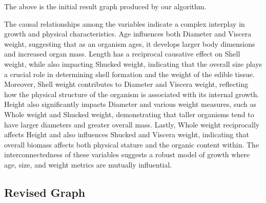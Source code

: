 \documentclass{article}
\begin{document}
The above is the initial result graph produced by our algorithm.

The causal relationships among the variables indicate a complex interplay in growth and physical characteristics. Age influences both Diameter and Viscera weight, suggesting that as an organism ages, it develops larger body dimensions and increased organ mass. Length has a reciprocal causative effect on Shell weight, while also impacting Shucked weight, indicating that the overall size plays a crucial role in determining shell formation and the weight of the edible tissue. Moreover, Shell weight contributes to Diameter and Viscera weight, reflecting how the physical structure of the organism is associated with its internal growth. Height also significantly impacts Diameter and various weight measures, such as Whole weight and Shucked weight, demonstrating that taller organisms tend to have larger diameters and greater overall mass. Lastly, Whole weight reciprocally affects Height and also influences Shucked and Viscera weight, indicating that overall biomass affects both physical stature and the organic content within. The interconnectedness of these variables suggests a robust model of growth where age, size, and weight metrics are mutually influential.

\subsection{Revised Graph}
\end{document}
